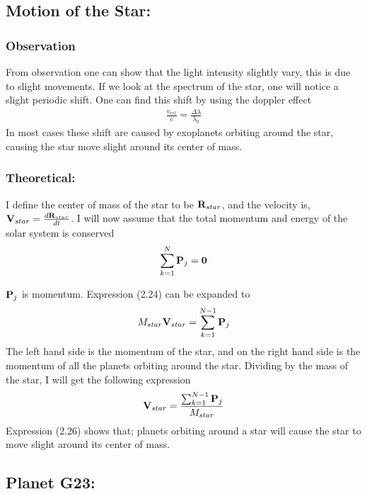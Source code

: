 \documentclass[a4paper,11pt,english]{report}
\begin{document}
\subsection{Motion of the Star:}
\subsubsection{Observation} From observation one can show that the light
intensity slightly vary, this is due to slight movements. If we look at the
spectrum of the star, one will notice a slight periodic shift. One can find
this shift by using the doppler effect
\begin{align}
  \frac{v_{rel}}{c} = \frac{\Delta \lambda}{\lambda_{0}}
\end{align}
In most cases these shift are caused by exoplanets  orbiting around the star,
causing the star move slight around its center of mass.

\subsubsection{Theoretical:}
I define the center of mass of the star to be \(\bold{R}_{star}\), and the
velocity is,
\(\bold{V}_{star} = \frac{d\bold{R}_{star}}{dt}\). I will now assume that the
total momentum and energy of the solar system is  conserved
\begin{align}
  \sum_{k =1}^{N}\bold{P}_{j} = \bold{0}
\end{align}

\(\bold{P}_{j}\) is momentum. Expression (2.24) can be expanded to
\begin{align}
  M_{star}\bold{V}_{star}  = \sum_{k=1}^{N-1}\bold{P}_{j}
\end{align}
The left hand side is the momentum of the star, and on the right hand side is
the momentum of all the planets orbiting around the star. Dividing by the mass
of the star, I will get the following expression
\begin{align}
  \bold{V}_{star} = \frac{ \sum_{k=1}^{N-1}\bold{P}_{j}}{M_{star}}
\end{align}
Expression (2.26) shows that; planets orbiting around a star will cause the
star to move slight around its center of mass. 
\subsection{Planet G23:}
\end{document}
